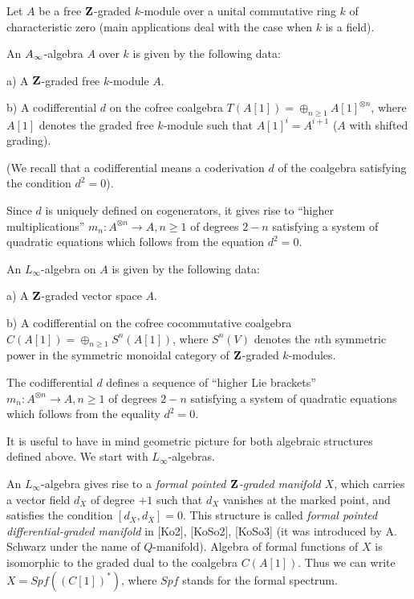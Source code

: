 \documentclass[a4paper,12pt]{article}
\begin{document}
Let $A$ be a free ${\bf Z}$-graded  $k$-module over a unital commutative ring $k$
of characteristic zero (main applications deal with the case when $k$ is a field).

\begin{dfn}
An $A_{\infty}$-algebra  $A$ over $k$ is given by the following data:

a) A ${\bf Z}$-graded free $k$-module $A$.

b) A codifferential $d$ on the
cofree coalgebra
$T(A[1])=\oplus_{n\ge 1}A[1]^{\otimes n}$, where $A[1]$ denotes
the graded free $k$-module such that $A[1]^i=A^{i+1}$ ($A$ with
shifted grading).

(We recall that a codifferential means a coderivation $d$
of the coalgebra satisfying the condition $d^2=0$).

\end{dfn}

Since $d$ is uniquely defined on cogenerators,
it gives rise to ``higher multiplications''
$m_n:A^{\otimes n}\to A, n\ge 1$ of degrees $2-n$ satisfying a
system of quadratic equations which follows from the equation
$d^2=0$.

\begin{dfn}

An $L_{\infty}$-algebra on $A$ 
is given by the following data:

a) A ${\bf Z}$-graded vector space $A$.

b) A  codifferential
on the cofree cocommutative coalgebra 
$C(A[1])=\oplus_{n\ge 1}S^n(A[1])$, where $S^n(V)$ denotes the 
$n$th symmetric power in the symmetric monoidal category of ${\bf Z}$-graded $k$-modules.

\end{dfn}

The codifferential $d$ defines a sequence of ``higher Lie brackets''
$m_n:A^{\otimes n}\to A, n\ge 1$ of degrees $2-n$ satisfying a system
of quadratic equations which  follows
from the equality $d^2=0$.


It is useful to have in mind geometric picture for both algebraic
structures defined above. We start with  $L_{\infty}$-algebras.

 An $L_{\infty}$-algebra gives rise to a {\it formal pointed
${\bf Z}$-graded manifold $X$}, which carries a vector field $d_X$
of degree $+1$ such that $d_X$ vanishes at the
marked point, and satisfies the condition $[d_X,d_X]=0$. This structure is
called {\it formal pointed differential-graded manifold} in [Ko2],
[KoSo2], [KoSo3] (it was introduced by
A. Schwarz under the name of $Q$-manifold).  Algebra of formal functions
of $X$ is isomorphic to the graded dual to the coalgebra $C(A[1])$.
Thus we can write $X=Spf((C[1])^{\ast})$, where $Spf$ stands for the formal spectrum.
\end{document}
